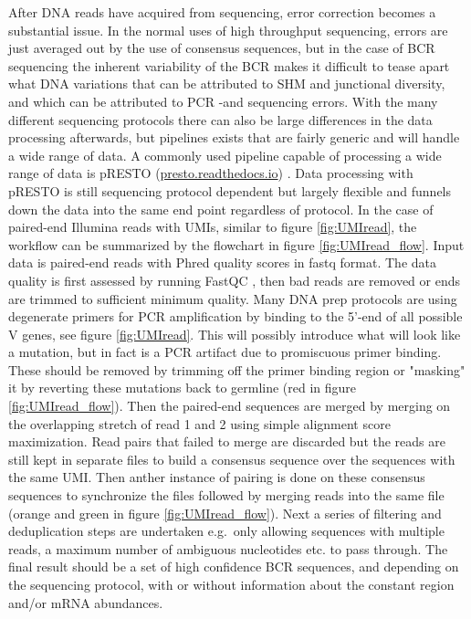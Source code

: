 After DNA reads have acquired from sequencing, error correction becomes a substantial issue.
In the normal uses of high throughput sequencing, errors are just averaged out by the use of consensus sequences, but in the case of BCR sequencing the inherent variability of the BCR makes it difficult to tease apart what DNA variations that can be attributed to SHM and junctional diversity, and which can be attributed to PCR -and sequencing errors.
With the many different sequencing protocols there can also be large differences in the data processing afterwards, but pipelines exists that are fairly generic and will handle a wide range of data.
A commonly used pipeline capable of processing a wide range of data is pRESTO (\url{presto.readthedocs.io}) \cite{vander2014presto}.
Data processing with pRESTO is still sequencing protocol dependent but largely flexible and funnels down the data into the same end point regardless of protocol.
In the case of paired-end Illumina reads with UMIs, similar to figure \ref{fig:UMIread}, the workflow can be summarized by the flowchart in figure \ref{fig:UMIread_flow}.
Input data is paired-end reads with Phred quality scores in fastq format.
The data quality is first assessed by running FastQC \cite{andrews2010fastqc}, then bad reads are removed or ends are trimmed to sufficient minimum quality.
Many DNA prep protocols are using degenerate primers for PCR amplification by binding to the 5'-end of all possible V genes, see figure \ref{fig:UMIread}.
This will possibly introduce what will look like a mutation, but in fact is a PCR artifact due to promiscuous primer binding.
These should be removed by trimming off the primer binding region or "masking" it by reverting these mutations back to germline (red in figure \ref{fig:UMIread_flow}).
Then the paired-end sequences are merged by merging on the overlapping stretch of read 1 and 2 using simple alignment score maximization.
Read pairs that failed to merge are discarded but the reads are still kept in separate files to build a consensus sequence over the sequences with the same UMI.
Then anther instance of pairing is done on these consensus sequences to synchronize the files followed by merging reads into the same file (orange and green in figure \ref{fig:UMIread_flow}).
Next a series of filtering and deduplication steps are undertaken e.g.\ only allowing sequences with multiple reads, a maximum number of ambiguous nucleotides etc. to pass through.
The final result should be a set of high confidence BCR sequences, and depending on the sequencing protocol, with or without information about the constant region and/or mRNA abundances.

